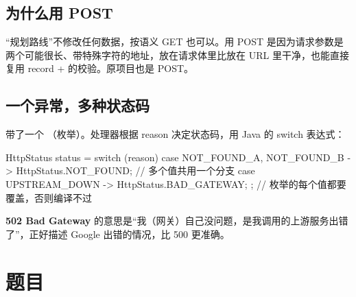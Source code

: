 \subsection{为什么用 POST}

“规划路线”不修改任何数据，按语义 GET 也可以。用 POST 是因为请求参数是两个可能很长、带特殊字符的地址，放在请求体里比放在 URL 里干净，也能直接复用 record +  的校验。原项目也是 POST。

\subsection{一个异常，多种状态码}

 带了一个 （枚举）。处理器根据 reason 决定状态码，用 Java 的 switch 表达式：

\begin{java}
HttpStatus status = switch (reason) {
    case NOT_FOUND_A, NOT_FOUND_B -> HttpStatus.NOT_FOUND;    // 多个值共用一个分支
    case UPSTREAM_DOWN -> HttpStatus.BAD_GATEWAY;
};                                                            // 枚举的每个值都要覆盖，否则编译不过
\end{java}

\textbf{502 Bad Gateway} 的意思是“我（网关）自己没问题，是我调用的上游服务出错了”，正好描述 Google 出错的情况，比 500 更准确。

\section{题目}

